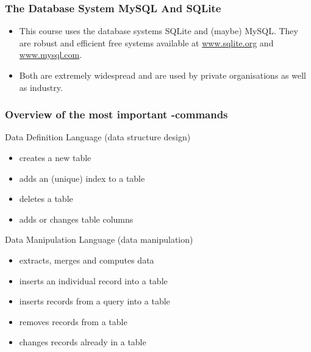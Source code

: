 \documentclass[dvipsnames,handout]{beamer}
\begin{document}
\begin{frame}
  \frametitle{The Database System MySQL And SQLite}

  \begin{itemize}
  \item This course uses the database systems SQLite and (maybe)
    MySQL.  They are robust and efficient free systems available at
    \url{www.sqlite.org} and \url{www.mysql.com}.
    
  \item Both are extremely widespread and are used by private
    organisations as well as industry.
    
  \end{itemize}
\end{frame}



\begin{frame}
\frametitle{Overview of the most important \sql{}-commands}

\begin{block}{Data Definition Language (data structure design)}
  \begin{itemize}
  \item {} creates a new table
  \item {} adds an (unique) index to a table
  \item {} deletes a table
  \item {} adds or changes table columns
  \end{itemize}
\end{block}

\begin{block}{Data Manipulation Language (data manipulation)}
  \begin{itemize}
  \item {} extracts, merges and computes data
  \item {} inserts an
    individual record into a table
  \item {} inserts records
    from a query into a table
  \item {} removes records from a table
  \item {} changes records already in a table
  \end{itemize}
\end{block}
\end{frame}
\end{document}
